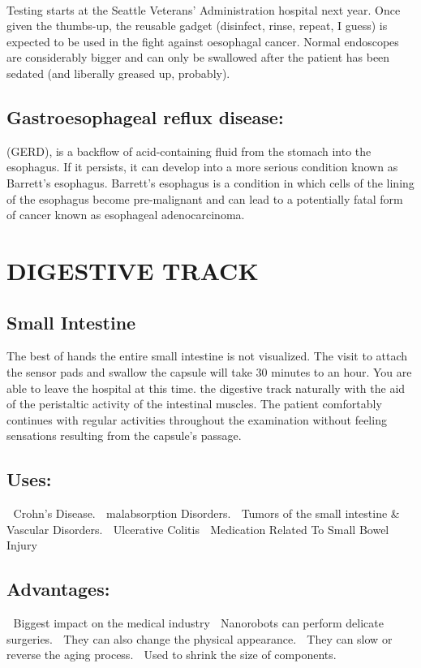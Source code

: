 \documentclass{article}
\begin{document}
\\Testing starts at the Seattle Veterans' Administration hospital next year. Once given the thumbs-up, the reusable gadget (disinfect, rinse, repeat, I guess) is expected to be used in the fight against oesophagal cancer. Normal endoscopes are considerably bigger and can only be swallowed after the patient has been sedated (and liberally greased up, probably).

\subsection{Gastroesophageal reflux disease:}
(GERD), is a backflow of acid-containing fluid from the stomach into the esophagus. If it persists, it can develop into a more serious condition known as Barrett’s esophagus. Barrett’s esophagus is a condition in which cells of the lining of the esophagus become pre-malignant and can lead to a potentially fatal form of cancer known as esophageal adenocarcinoma.

\section{DIGESTIVE TRACK}
\subsection{Small Intestine}
The best of hands the entire small intestine is not visualized. The visit to attach the sensor pads and swallow the capsule will take 30 minutes to an hour. You are able to leave the hospital at this time. the digestive track naturally with the aid of the peristaltic activity of the intestinal muscles. The patient comfortably continues with regular activities throughout the examination without feeling sensations resulting from the capsule's passage.
\subsection{Uses:}
 Crohn's Disease.
 malabsorption Disorders.
 Tumors of the small intestine & Vascular Disorders.
 Ulcerative Colitis
 Medication Related To Small Bowel Injury
 
 \subsection{Advantages:}
  Biggest impact on the medical industry
  Nanorobots can perform delicate surgeries.
 They can also change the physical appearance.
 They can slow or reverse the aging process.
 Used to shrink the size of components.
\end{document}
